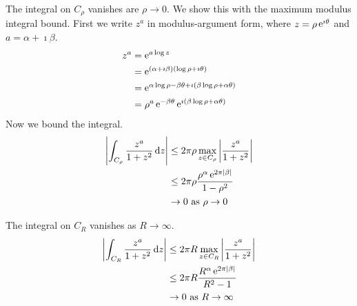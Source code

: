 {\begin{Solution}
\begin{enumerate}
    The integral on $C_\rho$ vanishes are $\rho \to 0$.  We show this
    with the maximum modulus integral bound.
    First we write $z^a$ in modulus-argument form, where $z = \rho \mathop{\mathrm{e}}\nolimits^{\imath \theta}$
    and $a = \alpha + \imath \beta$.
    \begin{align*}
      z^a     &= \mathop{\mathrm{e}}\nolimits^{a \log z} \\
      &= \mathop{\mathrm{e}}\nolimits^{ (\alpha + \imath \beta) (\log \rho + \imath \theta) } \\
      &= \mathop{\mathrm{e}}\nolimits^{ \alpha \log \rho - \beta \theta + \imath ( \beta \log \rho
        + \alpha \theta ) } \\
      &= \rho^a \mathop{\mathrm{e}}\nolimits^{ - \beta \theta } \mathop{\mathrm{e}}\nolimits^{ \imath ( \beta \log \rho
        + \alpha \theta ) } \\
    \end{align*}
    Now we bound the integral.
    \begin{align*}
      \left| \int_{C_\rho} \frac{z^a}{1+z^2}\,\mathrm{d} z \right|
      &\leq 2 \pi \rho \max_{z \in C_\rho} \left|
        \frac{z^a}{1+z^2} \right| \\
      &\leq 2 \pi \rho \frac{ \rho^\alpha \mathop{\mathrm{e}}\nolimits^{ 2 \pi |\beta|} }{1-\rho^2}\\
      &\to 0\ \mathrm{as}\ \rho \to 0
    \end{align*}

    The integral on $C_R$ vanishes as $R \to \infty$.
    \begin{align*}
      \left| \int_{C_R} \frac{z^a}{1+z^2}\,\mathrm{d} z \right|
      &\leq 2 \pi R \max_{z \in C_R} \left|
        \frac{z^a}{1+z^2} \right| \\
      &\leq 2 \pi R \frac{ R^\alpha \mathop{\mathrm{e}}\nolimits^{2 \pi |\beta|} }{R^2-1} \\
      &\to 0\ \mathrm{as}\ R \to \infty
    \end{align*}


\end{enumerate}
\end{Solution}}
